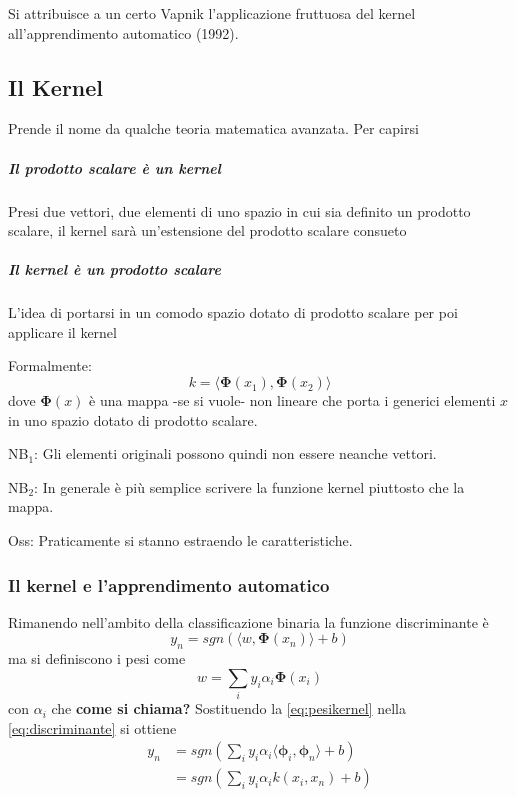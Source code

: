 Si attribuisce a un certo Vapnik l'applicazione fruttuosa
del kernel all'apprendimento automatico (1992).

\subsection{Il Kernel}
Prende il nome da qualche teoria matematica avanzata.
Per capirsi
\subparagraph{Il prodotto scalare \`e un kernel} Presi due vettori, due elementi di uno spazio
in cui sia definito un prodotto scalare,
il kernel sar\`a un'estensione del prodotto scalare consueto
\subparagraph{Il kernel \`e un prodotto scalare} L'idea
di portarsi in un comodo spazio dotato di prodotto scalare
per poi applicare il kernel


Formalmente:
\begin {equation}
  \label {eq:kernel}
  k = \langle \mathbf{\Phi}(x_1), \mathbf{\Phi}(x_2) \rangle
\end{equation}
dove $\mathbf{\Phi}(x)$ \`e una mappa -se si vuole- non lineare
che porta i generici elementi $x$
in uno spazio dotato di prodotto scalare.

NB$_{1}$: Gli elementi originali possono quindi non essere neanche vettori.\par
NB$_{2}$: In generale \`e pi\`u semplice scrivere la funzione kernel piuttosto che la mappa.\par
Oss: Praticamente si stanno estraendo le caratteristiche.\par

\subsubsection{Il kernel e l'apprendimento automatico}
Rimanendo nell'ambito della classificazione binaria
la funzione discriminante \`e
\begin{equation}
	\label{eq:discriminante}
	y_n = sgn \left(\langle w, \mathbf{\Phi}(x_n) \rangle + b \right)
\end{equation}
ma si definiscono i pesi come
\begin{equation}
  \label{eq:pesikernel}
  w = \sum_i y_i \alpha_i \mathbf{\Phi}(x_i)
\end{equation}
con $\alpha_i$ che \textbf{come si chiama?}
Sostituendo la \ref{eq:pesikernel} nella \ref{eq:discriminante}
si ottiene
\begin{align}
  y_n &= sgn \left(\sum_i y_i \alpha_i \langle \mathbf{\mathbf{\phi}}_i,\mathbf{\mathbf{\phi}}_n \rangle + b \right) \\
  &= sgn \left(\sum_i y_i \alpha_i k(x_i,x_n) + b \right)
  \label{eq:uscitakernel}
\end{align}

